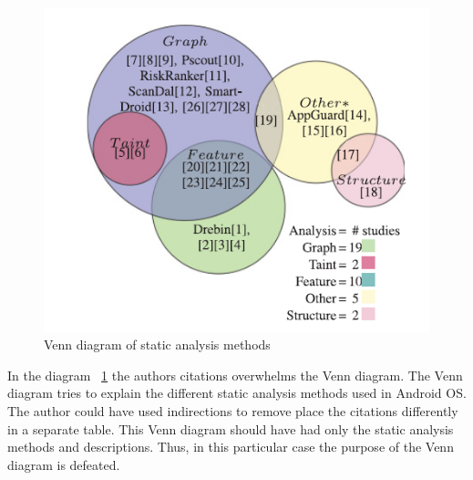 \documentclass[12pt]{article}
\begin{document}
\begin{figure}[h!]
        \centerline{\includegraphics[scale=0.45]{venn_diagram.PNG}}
        \caption{Venn diagram of static analysis methods ~\cite[fig 3 b]{Tam:2017:EAM:3022634.3017427}}
        \label{lbl_venn}
\end{figure}
In the diagram ~\ref{lbl_venn} the authors citations overwhelms the Venn diagram. The Venn diagram tries to explain the different static analysis methods used in Android OS. The author could have used indirections to remove place the citations differently in a separate table. This Venn diagram should have had only the static analysis methods and descriptions. Thus, in this particular case the purpose of the Venn diagram is defeated. \\
\end{document}
